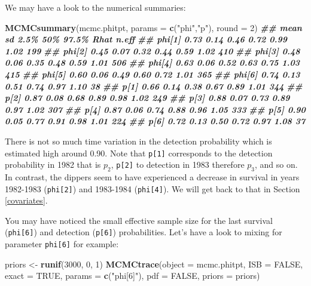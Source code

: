 \documentclass[
  12pt,
]{krantz}
\newenvironment{Shaded}{\begin{snugshade}}{\end{snugshade}}
\newcommand{\AttributeTok}[1]{\textcolor[rgb]{0.13,0.29,0.53}{#1}}
\newcommand{\ConstantTok}[1]{\textcolor[rgb]{0.56,0.35,0.01}{#1}}
\newcommand{\DecValTok}[1]{\textcolor[rgb]{0.00,0.00,0.81}{#1}}
\newcommand{\DocumentationTok}[1]{\textcolor[rgb]{0.56,0.35,0.01}{\textbf{\textit{#1}}}}
\newcommand{\FunctionTok}[1]{\textcolor[rgb]{0.13,0.29,0.53}{\textbf{#1}}}
\newcommand{\NormalTok}[1]{#1}
\newcommand{\OtherTok}[1]{\textcolor[rgb]{0.56,0.35,0.01}{#1}}
\newcommand{\StringTok}[1]{\textcolor[rgb]{0.31,0.60,0.02}{#1}}
\begin{document}
We may have a look to the numerical summaries:

\begin{Shaded}
\begin{Highlighting}[]
\FunctionTok{MCMCsummary}\NormalTok{(mcmc.phitpt, }\AttributeTok{params =} \FunctionTok{c}\NormalTok{(}\StringTok{"phi"}\NormalTok{,}\StringTok{"p"}\NormalTok{), }\AttributeTok{round =} \DecValTok{2}\NormalTok{)}
\DocumentationTok{\#\#        mean   sd 2.5\%  50\% 97.5\% Rhat n.eff}
\DocumentationTok{\#\# phi[1] 0.73 0.14 0.46 0.72  0.99 1.02   199}
\DocumentationTok{\#\# phi[2] 0.45 0.07 0.32 0.44  0.59 1.02   410}
\DocumentationTok{\#\# phi[3] 0.48 0.06 0.35 0.48  0.59 1.01   506}
\DocumentationTok{\#\# phi[4] 0.63 0.06 0.52 0.63  0.75 1.03   415}
\DocumentationTok{\#\# phi[5] 0.60 0.06 0.49 0.60  0.72 1.01   365}
\DocumentationTok{\#\# phi[6] 0.74 0.13 0.51 0.74  0.97 1.10    38}
\DocumentationTok{\#\# p[1]   0.66 0.14 0.38 0.67  0.89 1.01   344}
\DocumentationTok{\#\# p[2]   0.87 0.08 0.68 0.89  0.98 1.02   249}
\DocumentationTok{\#\# p[3]   0.88 0.07 0.73 0.89  0.97 1.02   307}
\DocumentationTok{\#\# p[4]   0.87 0.06 0.74 0.88  0.96 1.05   333}
\DocumentationTok{\#\# p[5]   0.90 0.05 0.77 0.91  0.98 1.01   224}
\DocumentationTok{\#\# p[6]   0.72 0.13 0.50 0.72  0.97 1.08    37}
\end{Highlighting}
\end{Shaded}

There is not so much time variation in the detection probability which is estimated high around 0.90. Note that \texttt{p{[}1{]}} corresponds to the detection probability in 1982 that is \(p_2\), \texttt{p{[}2{]}} to detection in 1983 therefore \(p_3\), and so on. In contrast, the dippers seem to have experienced a decrease in survival in years 1982-1983 (\texttt{phi{[}2{]}}) and 1983-1984 (\texttt{phi{[}4{]}}). We will get back to that in Section \ref{covariates}.

You may have noticed the small effective sample size for the last survival (\texttt{phi{[}6{]}}) and detection (\texttt{p{[}6{]}}) probabilities. Let's have a look to mixing for parameter \texttt{phi{[}6{]}} for example:

\begin{Shaded}
\begin{Highlighting}[]
\NormalTok{priors }\OtherTok{\textless{}{-}} \FunctionTok{runif}\NormalTok{(}\DecValTok{3000}\NormalTok{, }\DecValTok{0}\NormalTok{, }\DecValTok{1}\NormalTok{)}
\FunctionTok{MCMCtrace}\NormalTok{(}\AttributeTok{object =}\NormalTok{ mcmc.phitpt,}
          \AttributeTok{ISB =} \ConstantTok{FALSE}\NormalTok{,}
          \AttributeTok{exact =} \ConstantTok{TRUE}\NormalTok{, }
          \AttributeTok{params =} \FunctionTok{c}\NormalTok{(}\StringTok{"phi[6]"}\NormalTok{),}
          \AttributeTok{pdf =} \ConstantTok{FALSE}\NormalTok{, }
          \AttributeTok{priors =}\NormalTok{ priors)}
\end{Highlighting}
\end{Shaded}
\end{document}
